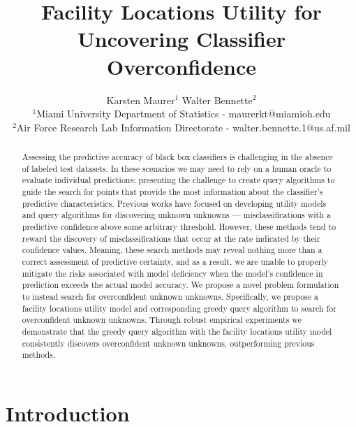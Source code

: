 \documentclass[letterpaper]{article} %
\begin{document}
%
\title{Facility Locations Utility for Uncovering Classifier Overconfidence}
\author{Karsten Maurer$^1$ \hspace{.2in} Walter Bennette$^2$\\
$^1$Miami University Department of Statistics - maurerkt@miamioh.edu\\ 
$^2$Air Force Research Lab Information Directorate - walter.bennette.1@us.af.mil \\
}

\maketitle

\begin{abstract}
Assessing the predictive accuracy of black box classifiers is challenging in the absence of labeled test datasets. In these scenarios we may need to rely on a human oracle to evaluate individual predictions; presenting the challenge to create query algorithms to guide the search for points that provide the most information about the classifier's predictive characteristics. Previous works have focused on developing utility models and query algorithms for discovering unknown unknowns --- misclassifications with a predictive confidence above some arbitrary threshold. However, these methods tend to reward the discovery of misclassifications that occur at the rate indicated by their confidence values.  Meaning, these search methods may reveal nothing more than a correct assessment of predictive certainty, and as a result, we are unable to properly mitigate the risks associated with model deficiency when the model's confidence in prediction exceeds the actual model accuracy. We propose a novel problem formulation to instead search for overconfident unknown unknowns. Specifically, we propose a facility locations utility model and corresponding greedy query algorithm to search for overconfident unknown unknowns. Through robust empirical experiments we demonstrate that the greedy query algorithm with the facility locations utility model consistently discovers overconfident unknown unknowns, outperforming previous methods. 
\end{abstract}


\section{Introduction}
\end{document}

